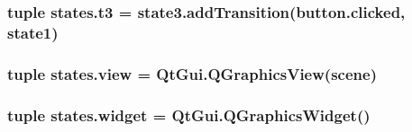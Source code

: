 \subsubsection[{t3}]{\setlength{\rightskip}{0pt plus 5cm}tuple states.\+t3 = state3.\+add\+Transition(button.\+clicked, {\bf state1})}\label{namespacestates_ad429a6e4ea7d6eb7bb05fa58f4280596}
\hypertarget{namespacestates_aa8f89fa91e0a40d52c2ac2a157394224}{}
\subsubsection[{view}]{\setlength{\rightskip}{0pt plus 5cm}tuple states.\+view = Qt\+Gui.\+Q\+Graphics\+View({\bf scene})}\label{namespacestates_aa8f89fa91e0a40d52c2ac2a157394224}
\hypertarget{namespacestates_a258754aba959b1b63fe8ea95046db14e}{}
\subsubsection[{widget}]{\setlength{\rightskip}{0pt plus 5cm}tuple states.\+widget = Qt\+Gui.\+Q\+Graphics\+Widget()}\label{namespacestates_a258754aba959b1b63fe8ea95046db14e}
